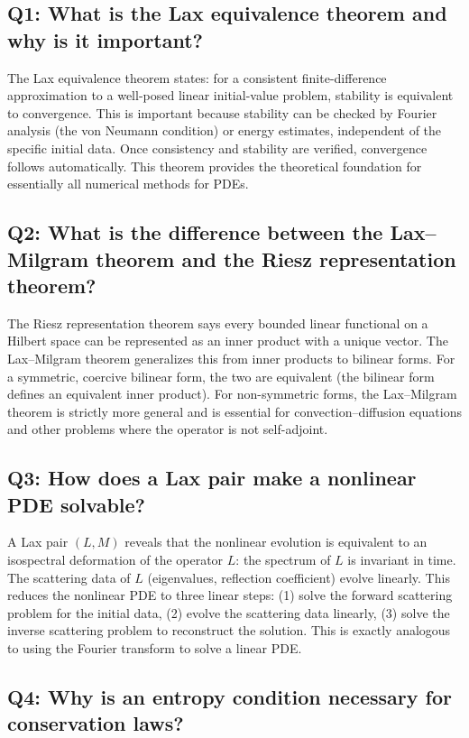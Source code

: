 \subsection*{Q1: What is the Lax equivalence theorem and why is it important?}

The Lax equivalence theorem states: for a consistent finite-difference approximation to a well-posed linear initial-value problem, stability is equivalent to convergence. This is important because stability can be checked by Fourier analysis (the von Neumann condition) or energy estimates, independent of the specific initial data. Once consistency and stability are verified, convergence follows automatically. This theorem provides the theoretical foundation for essentially all numerical methods for PDEs.

\subsection*{Q2: What is the difference between the Lax--Milgram theorem and the Riesz representation theorem?}

The Riesz representation theorem says every bounded linear functional on a Hilbert space can be represented as an inner product with a unique vector. The Lax--Milgram theorem generalizes this from inner products to bilinear forms. For a symmetric, coercive bilinear form, the two are equivalent (the bilinear form defines an equivalent inner product). For non-symmetric forms, the Lax--Milgram theorem is strictly more general and is essential for convection--diffusion equations and other problems where the operator is not self-adjoint.

\subsection*{Q3: How does a Lax pair make a nonlinear PDE solvable?}

A Lax pair \((L,M)\) reveals that the nonlinear evolution is equivalent to an isospectral deformation of the operator \(L\): the spectrum of \(L\) is invariant in time. The scattering data of \(L\) (eigenvalues, reflection coefficient) evolve linearly. This reduces the nonlinear PDE to three linear steps: (1) solve the forward scattering problem for the initial data, (2) evolve the scattering data linearly, (3) solve the inverse scattering problem to reconstruct the solution. This is exactly analogous to using the Fourier transform to solve a linear PDE.

\subsection*{Q4: Why is an entropy condition necessary for conservation laws?}

